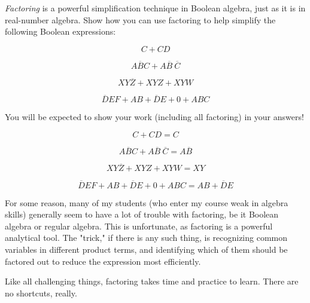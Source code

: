 

{\it Factoring} is a powerful simplification technique in Boolean algebra, just as it is in real-number algebra.  Show how you can use factoring to help simplify the following Boolean expressions:

$$C + CD$$

$$A\overline{B}C +  A\overline{B} \> \overline{C}$$

$$XY\overline{Z} + XYZ + XYW$$

$$\overline{D}EF + AB + \overline{D}E + 0 + ABC$$







You will be expected to show your work (including all factoring) in your answers!

$$C + CD = C$$

$$A\overline{B}C +  A\overline{B} \> \overline{C} = A\overline{B}$$

$$XY\overline{Z} + XYZ + XYW = XY$$

$$\overline{D}EF + AB + \overline{D}E + 0 + ABC = AB + \overline{D}E$$







For some reason, many of my students (who enter my course weak in algebra skills) generally seem to have a lot of trouble with factoring, be it Boolean algebra or regular algebra.  This is unfortunate, as factoring is a powerful analytical tool.  The "trick," if there is any such thing, is recognizing common variables in different product terms, and identifying which of them should be factored out to reduce the expression most efficiently.

Like all challenging things, factoring takes time and practice to learn.  There are no shortcuts, really.




